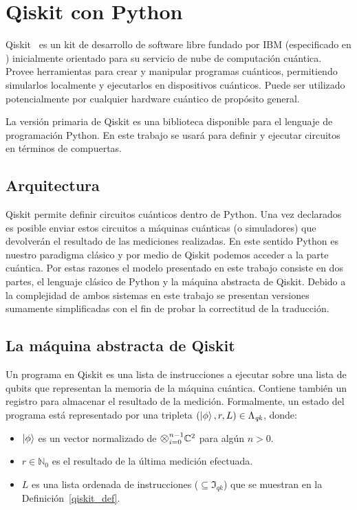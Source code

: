 \chapter{Qiskit con Python}\label{ch:python}


Qiskit~\cite{QiskitOfficial, QiskitTextbook} es un kit de desarrollo de software libre fundado por IBM (especificado en \cite{qiskit_spec}) inicialmente orientado para su servicio de nube de computación cuántica. Provee herramientas para crear y manipular programas cuánticos, permitiendo simularlos localmente y ejecutarlos en dispositivos cuánticos. Puede ser utilizado potencialmente por cualquier hardware cuántico de propósito general.

La versión primaria de Qiskit es una biblioteca disponible para el lenguaje de programación Python. En este trabajo se usará para definir y ejecutar circuitos en términos de compuertas.


\section{Arquitectura}
Qiskit permite definir circuitos cuánticos dentro de Python. Una vez declarados es posible enviar estos circuitos a máquinas cuánticas (o simuladores) que devolverán el resultado de las mediciones realizadas. En este sentido Python es nuestro paradigma clásico y por medio de Qiskit podemos acceder a la parte cuántica. Por estas razones el modelo presentado en este trabajo consiste en dos partes, el lenguaje clásico de Python y la máquina abstracta de Qiskit. Debido a la complejidad de ambos sistemas en este trabajo se presentan versiones sumamente simplificadas con el fin de probar la correctitud de la traducción.

\section{La máquina abstracta de Qiskit}

Un programa en Qiskit es una lista de instrucciones a ejecutar sobre una lista de qubits que representan la memoria de la máquina cuántica. Contiene también un registro para almacenar el resultado de la medición. Formalmente, un estado del programa está representado por una tripleta $(\ket{\phi}, r, L) \in \Lambda_\textit{qk}$, donde:
\begin{itemize}
    \item $\ket{\phi}$ es un vector normalizado de $\mathlarger{\mathlarger{\otimes}}_{i=0}^{n-1}\mathbb{C}^2 $ para algún $n > 0$.
    \item $r \in \mathbb{N}_0$ es el resultado de la última medición efectuada.
    \item $L$ es una lista ordenada de instrucciones ($\subseteq \mathfrak{I}_\textit{qk}$) que se muestran en la Definición~\ref{qiskit_def}.
\end{itemize}

